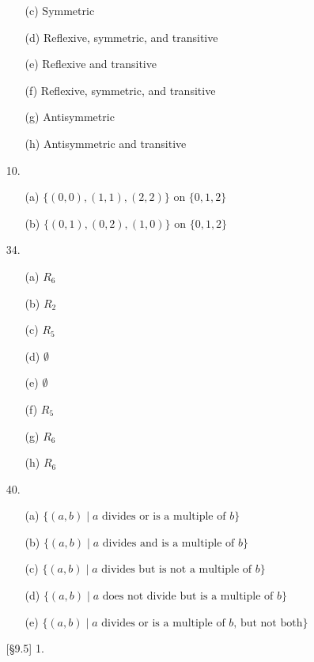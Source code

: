 \documentclass{article}
\begin{document}
\begin{enumerate}
\begin{itemize}
            \item[(c)] Symmetric
            \item[(d)] Reflexive, symmetric, and transitive
            \item[(e)] Reflexive and transitive
            \item[(f)] Reflexive, symmetric, and transitive
            \item[(g)] Antisymmetric
            \item[(h)] Antisymmetric and transitive
        \end{itemize}
    \item[10.]
        \begin{itemize}
            \item[(a)] $\{ (0,0), (1,1), (2,2) \}$ on $\{ 0,1,2 \}$
            \item[(b)] $\{ (0,1), (0,2), (1,0) \}$ on $\{ 0,1,2 \}$
        \end{itemize}
    \item[34.]
        \begin{itemize}
            \item[(a)] $R_6$
            \item[(b)] $R_2$
            \item[(c)] $R_5$
            \item[(d)] $\emptyset$
            \item[(e)] $\emptyset$
            \item[(f)] $R_5$
            \item[(g)] $R_6$
            \item[(h)] $R_6$
        \end{itemize}
    \item[40.]
        \begin{itemize}
            \item[(a)] $\{ (a,b) \mid a \text{ divides or is a multiple of } b \}$
            \item[(b)] $\{ (a,b) \mid a \text{ divides and is a multiple of } b \}$
            \item[(c)] $\{ (a,b) \mid a \text{ divides but is not a multiple of } b \}$
            \item[(d)] $\{ (a,b) \mid a \text{ does not divide but is a multiple of } b \}$
            \item[(e)] $\{ (a,b) \mid a \text{ divides or is a multiple of } b \text{, but not both} \}$
        \end{itemize}
    \item[{[\S 9.5]} 1.]

\end{enumerate}
\end{document}
